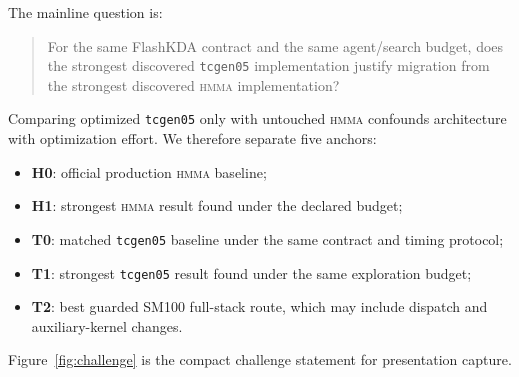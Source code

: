 \documentclass[11pt]{article}
\newcommand{\hmma}{\textsc{hmma}}
\newcommand{\tcgen}{\texttt{tcgen05}}
\begin{document}
The mainline question is:
\begin{quote}\small
For the same FlashKDA contract and the same agent/search budget, does the strongest discovered \tcgen{} implementation justify migration from the strongest discovered \hmma{} implementation?
\end{quote}
Comparing optimized \tcgen{} only with untouched \hmma{} confounds architecture with optimization effort. We therefore separate five anchors:
\begin{itemize}
  \item \textbf{H0}: official production \hmma{} baseline;
  \item \textbf{H1}: strongest \hmma{} result found under the declared budget;
  \item \textbf{T0}: matched \tcgen{} baseline under the same contract and timing protocol;
  \item \textbf{T1}: strongest \tcgen{} result found under the same exploration budget;
  \item \textbf{T2}: best guarded SM100 full-stack route, which may include dispatch and auxiliary-kernel changes.
\end{itemize}

Figure~\ref{fig:challenge} is the compact challenge statement for presentation capture.
\end{document}

